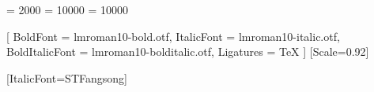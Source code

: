 

\usepackage{geometry}
\geometry{
  a4paper,
  left   = 3.2cm, right  = 3.2cm,
  top    = 3.0cm, bottom = 2.8cm,
  headsep = 0.6cm, footskip = 1.0cm
}
\usepackage{setspace}

\setlength{\emergencystretch}{2.5em}
\tolerance         = 2000
\hbadness          = 10000   %
\vbadness          = 10000


\usepackage{fontspec}
\setmainfont{lmroman10-regular.otf}[
  BoldFont       = lmroman10-bold.otf,
  ItalicFont     = lmroman10-italic.otf,
  BoldItalicFont = lmroman10-bolditalic.otf,
  Ligatures      = TeX
]
\setsansfont{Helvetica Neue}
\setmonofont{Menlo}[Scale=0.92]

[ItalicFont=STFangsong]   %


\usepackage{amsmath}
\usepackage{amssymb}
\usepackage{mathtools}
\usepackage{bm}
\allowdisplaybreaks

